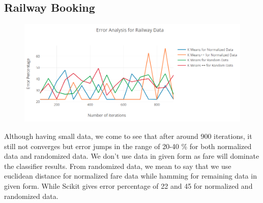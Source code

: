 \documentclass[conference]{IEEEtran}
\begin{document}
    \subsection{Railway Booking}
    \begin{figure}[htbp]
    \centerline{\includegraphics[width=\columnwidth]{kmeansRailway.PNG}}
    \label{fig}
    \end{figure}
    Although having small data, we come to see that after around 900 iterations, it still not converges but error jumps in the range of 20-40 \% for both normalized data and randomized data. We don't use data in given form as fare will dominate the classifier results. From randomized data, we mean to say that we use euclidean distance for normalized fare data while hamming for remaining data in given form. While Scikit gives error percentage of 22 and 45 for normalized and randomized data.
\end{document}
